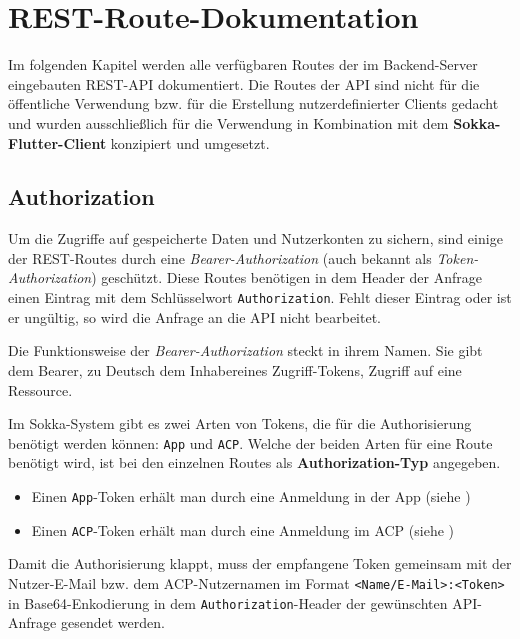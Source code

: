 \chapter{REST-Route-Dokumentation}
\label{restdoc}

Im folgenden Kapitel werden alle verfügbaren Routes der im Backend-Server eingebauten REST-API dokumentiert. Die Routes der API sind nicht für die öffentliche Verwendung bzw. für die Erstellung nutzerdefinierter Clients gedacht und wurden ausschließlich für die Verwendung in Kombination mit dem \textbf{Sokka-Flutter-Client} konzipiert und umgesetzt.

\section{Authorization}

Um die Zugriffe auf gespeicherte Daten und Nutzerkonten zu sichern, sind einige der REST-Routes durch eine \textit{Bearer-Authorization} (auch bekannt als \textit{Token-Authorization}) geschützt. Diese Routes benötigen in dem Header der Anfrage einen Eintrag mit dem Schlüsselwort \lstinline{Authorization}. Fehlt dieser Eintrag oder ist er ungültig, so wird die Anfrage an die API nicht bearbeitet.

Die Funktionsweise der \textit{Bearer-Authorization} steckt in ihrem Namen. Sie gibt dem \glqq Bearer\grqq, zu Deutsch dem \glqq Inhaber\grqq\space eines Zugriff-Tokens, Zugriff auf eine Ressource. \cite{levin2019}

Im Sokka-System gibt es zwei Arten von Tokens, die für die Authorisierung benötigt werden können: \lstinline{App} und \lstinline{ACP}. Welche der beiden Arten für eine Route benötigt wird, ist bei den einzelnen Routes als \textbf{Authorization-Typ} angegeben.

\begin{itemize}
    \item Einen \lstinline{App}-Token erhält man durch eine Anmeldung in der App (siehe )
    \item Einen \lstinline{ACP}-Token erhält man durch eine Anmeldung im ACP (siehe )
\end{itemize}

Damit die Authorisierung klappt, muss der empfangene Token gemeinsam mit der Nutzer-E-Mail bzw. dem ACP-Nutzernamen im Format \lstinline{<Name/E-Mail>:<Token>} in Base64-Enkodierung in dem \lstinline{Authorization}-Header der gewünschten API-Anfrage gesendet werden.

